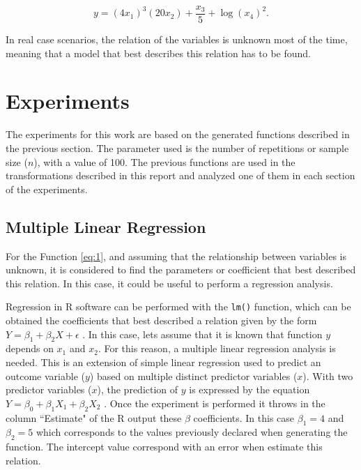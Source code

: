 \documentclass[10pt,leter,openany]{article}
\begin{document}
		\begin{equation} \label{eq:5}
			y = (4x_{1})^{3}(20x_{2}) + \dfrac{x_{3}}{5} + \log (x_{4})^{2} .
		\end{equation}  
	
	
	In real case scenarios, the relation of the variables is unknown most of the time, meaning that a model that best describes this relation has to be found.


\section{Experiments}

	The experiments for this work are based on the generated functions described in the previous section. The parameter used is the number of repetitions or sample size ($n$), with a value of 100. The previous functions are used in the transformations described in this report and analyzed one of them in each section of the experiments.

	\subsection{Multiple Linear Regression}

		For the Function \ref{eq:1}, and assuming that the relationship between variables is unknown, it is considered to find the parameters or coefficient that best described this relation. In this case, it could be useful to perform a regression analysis.


		Regression in R software can be performed with the \texttt{lm()} function, which can be obtained the coefficients that best described a relation given by the form $ Y = \beta_{1} + \beta_{2}X + \epsilon$ \citep{selva2016}. In this case, lets assume that it is known that function $y$  depends on $x_{1}$ and $x_{2}$. For this reason, a multiple linear regression analysis is needed. This is an extension of simple linear regression used to predict an outcome variable ($y$) based on multiple distinct predictor variables ($x$). With two predictor variables ($x$), the prediction of $y$ is expressed by the  equation $ Y = \beta_{0} + \beta_{1}X_{1} + \beta_{2}X_{2}$ \citep{kassambara2018}. Once the experiment is performed it throws in the column ``Estimate" of the R output these $\beta$ coefficients. In this case $\beta_{1}=4$ and $\beta_{2}=5$ which corresponds to the values previously declared when generating the function. The intercept value correspond with an error when estimate this relation.
\end{document}
